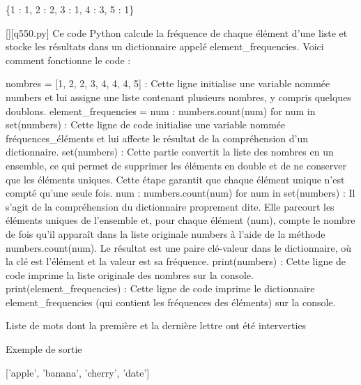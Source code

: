 \{1 : 1, 2 : 2, 3 : 1, 4 : 3, 5 : 1\}
        \par
        \begin{solution}
            \renewcommand{\nomfichier}{q550.py}
            \pythonfile{\chemincode \nomfichier}[][\nomfichier]
            Ce code Python calcule la fréquence de chaque élément d'une liste et stocke les résultats dans un dictionnaire appelé element_frequencies. Voici comment fonctionne le code :

    nombres = [1, 2, 2, 3, 4, 4, 4, 5] : Cette ligne initialise une variable nommée numbers et lui assigne une liste contenant plusieurs nombres, y compris quelques doublons.
    element_frequencies = {num : numbers.count(num) for num in set(numbers)} : Cette ligne de code initialise une variable nommée fréquences_éléments et lui affecte le résultat de la compréhension d'un dictionnaire.
        set(numbers) : Cette partie convertit la liste des nombres en un ensemble, ce qui permet de supprimer les éléments en double et de ne conserver que les éléments uniques. Cette étape garantit que chaque élément unique n'est compté qu'une seule fois.
        {num : numbers.count(num) for num in set(numbers)} : Il s'agit de la compréhension du dictionnaire proprement dite. Elle parcourt les éléments uniques de l'ensemble et, pour chaque élément (num), compte le nombre de fois qu'il apparaît dans la liste originale numbers à l'aide de la méthode numbers.count(num). Le résultat est une paire clé-valeur dans le dictionnaire, où la clé est l'élément et la valeur est sa fréquence.
    print(numbers) : Cette ligne de code imprime la liste originale des nombres sur la console.
    print(element_frequencies) : Cette ligne de code imprime le dictionnaire element_frequencies (qui contient les fréquences des éléments) sur la console.
        \end{solution}
        

        \question
        Liste de mots dont la première et la dernière lettre ont été interverties

Exemple de sortie

['apple', 'banana', 'cherry', 'date']

